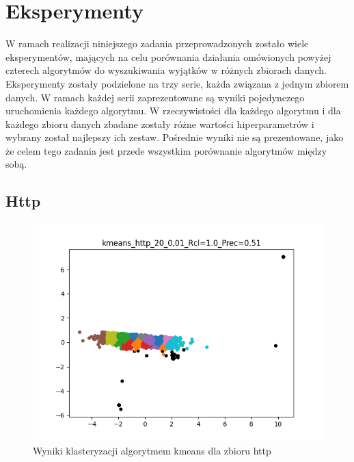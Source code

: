 \documentclass{classrep}
\begin{document}
    \section{Eksperymenty} {

        W ramach realizacji niniejszego zadania przeprowadzonych zostało wiele
        eksperymentów, mających na celu porównania działania omówionych powyżej
        czterech algorytmów do wyszukiwania wyjątków w różnych zbiorach danych.
        Eksperymenty zostały podzielone na trzy serie, każda związana z jednym zbiorem
        danych. W ramach każdej serii zaprezentowane są wyniki pojedynczego
        uruchomienia każdego algorytmu. W rzeczywistości dla każdego algorytmu i dla
        każdego zbioru danych zbadane zostały różne wartości hiperparametrów i wybrany
        został najlepszy ich zestaw. Pośrednie wyniki nie są prezentowane, jako że
        celem tego zadania jest przede wszystkim porównanie algorytmów między sobą.

        \subsection{Http} {
            \begin{figure}[!htbp]
                \centering
                \includegraphics[width=\textwidth]{img/kmeans_http_20_0,01_-115739.png}
                \caption
                {Wyniki klasteryzacji algorytmem kmeans dla zbioru http}
                \label{fig:http_kmeans}
            \end{figure}

}}
\end{document}
